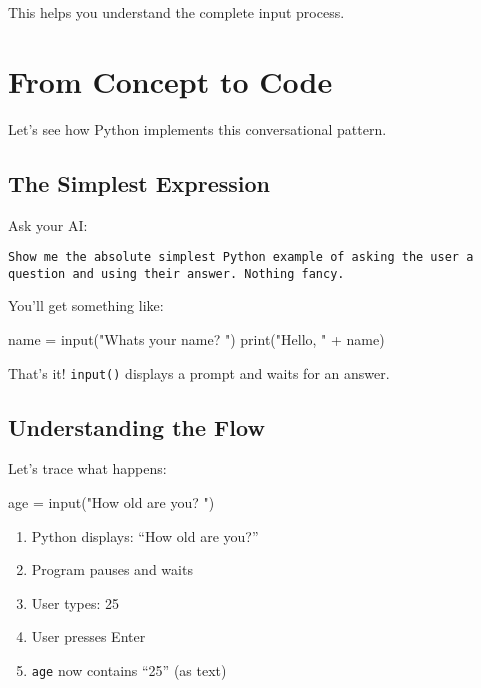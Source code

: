 \documentclass[
  letterpaper,
  DIV=11,
  numbers=noendperiod,
  oneside]{scrreprt}
\newenvironment{Shaded}{}{}
\newcommand{\BuiltInTok}[1]{\textcolor[rgb]{0.84,0.23,0.29}{#1}}
\newcommand{\NormalTok}[1]{\textcolor[rgb]{0.14,0.16,0.18}{#1}}
\newcommand{\OperatorTok}[1]{\textcolor[rgb]{0.14,0.16,0.18}{#1}}
\newcommand{\StringTok}[1]{\textcolor[rgb]{0.01,0.18,0.38}{#1}}
\providecommand{\tightlist}{%
  \setlength{\itemsep}{0pt}\setlength{\parskip}{0pt}}\usepackage{longtable,booktabs,array}
\begin{document}
This helps you understand the complete input process.

\section{From Concept to Code}\label{from-concept-to-code-2}

Let's see how Python implements this conversational pattern.

\subsection{The Simplest Expression}\label{the-simplest-expression-2}

Ask your AI:

\begin{verbatim}
Show me the absolute simplest Python example of asking the user a question and using their answer. Nothing fancy.
\end{verbatim}

You'll get something like:

\begin{Shaded}
\begin{Highlighting}[]
\NormalTok{name }\OperatorTok{=} \BuiltInTok{input}\NormalTok{(}\StringTok{"What\textquotesingle{}s your name? "}\NormalTok{)}
\BuiltInTok{print}\NormalTok{(}\StringTok{"Hello, "} \OperatorTok{+}\NormalTok{ name)}
\end{Highlighting}
\end{Shaded}

That's it! \texttt{input()} displays a prompt and waits for an answer.

\subsection{Understanding the Flow}\label{understanding-the-flow}

Let's trace what happens:

\begin{Shaded}
\begin{Highlighting}[]
\NormalTok{age }\OperatorTok{=} \BuiltInTok{input}\NormalTok{(}\StringTok{"How old are you? "}\NormalTok{)}
\end{Highlighting}
\end{Shaded}

\begin{enumerate}
\def\labelenumi{\arabic{enumi}.}
\tightlist
\item
  Python displays: ``How old are you?''
\item
  Program pauses and waits
\item
  User types: 25
\item
  User presses Enter
\item
  \texttt{age} now contains ``25'' (as text)
\end{enumerate}
\end{document}
